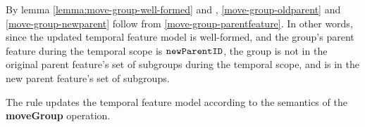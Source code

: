 By lemma \vref{lemma:move-group-well-formed} and , \ref{move-group-oldparent} and \ref{move-group-newparent} follow from \ref{move-group-parentfeature}. In other words, since the updated temporal feature model is well-formed, and the group's parent feature during the temporal scope is $\texttt{newParentID}$, the group is not in the original parent feature's set of subgroups during the temporal scope, and is in the new parent feature's set of subgroups.
\\

\begin{lemma}
   The  rule updates the temporal feature model according to the semantics of the \textbf{moveGroup} operation.
   \label{lemma:move-group-mod}
\end{lemma}
